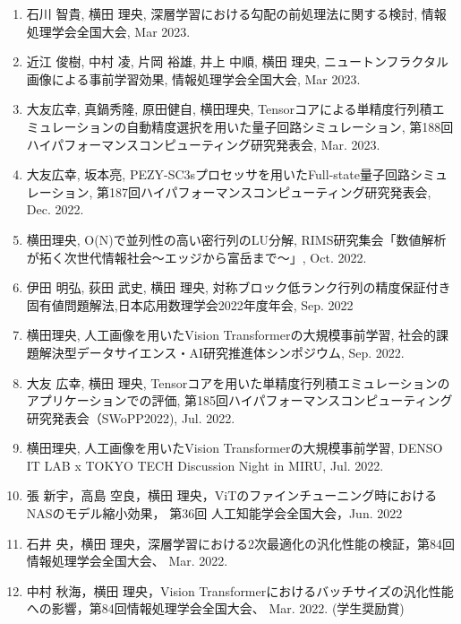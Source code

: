 \documentclass[margin,line]{cv}
\begin{document}
\begin{resume}
\begin{enumerate}
\item 石川 智貴, 横田 理央, 深層学習における勾配の前処理法に関する検討, 情報処理学会全国大会, Mar 2023.

\item 近江 俊樹, 中村 凌, 片岡 裕雄, 井上 中順, 横田 理央, ニュートンフラクタル画像による事前学習効果, 情報処理学会全国大会, Mar 2023.

\item 大友広幸, 真鍋秀隆, 原田健自, 横田理央, Tensorコアによる単精度行列積エミュレーションの自動精度選択を用いた量子回路シミュレーション, 第188回ハイパフォーマンスコンピューティング研究発表会, Mar. 2023.

\item 大友広幸, 坂本亮, PEZY-SC3sプロセッサを用いたFull-state量子回路シミュレーション, 第187回ハイパフォーマンスコンピューティング研究発表会, Dec. 2022.

\item 横田理央, O(N)で並列性の高い密行列のLU分解, RIMS研究集会「数値解析が拓く次世代情報社会～エッジから富岳まで～」, Oct. 2022.

\item 伊田 明弘, 荻田 武史, 横田 理央, 対称ブロック低ランク行列の精度保証付き固有値問題解法,日本応用数理学会2022年度年会, Sep. 2022

\item 横田理央, 人工画像を用いたVision Transformerの大規模事前学習, 社会的課題解決型データサイエンス・AI研究推進体シンポジウム, Sep. 2022.

\item 大友 広幸, 横田 理央, Tensorコアを用いた単精度行列積エミュレーションのアプリケーションでの評価, 第185回ハイパフォーマンスコンピューティング研究発表会（SWoPP2022), Jul. 2022.

\item 横田理央, 人工画像を用いたVision Transformerの大規模事前学習, DENSO IT LAB x TOKYO TECH Discussion Night in MIRU, Jul. 2022.

\item 張 新宇，高島 空良，横田 理央，ViTのファインチューニング時におけるNASのモデル縮小効果，
第36回 人工知能学会全国大会，Jun. 2022

\item 石井 央，横田 理央，深層学習における2次最適化の汎化性能の検証，第84回情報処理学会全国大会、 Mar. 2022.

\item 中村 秋海，横田 理央，Vision Transformerにおけるバッチサイズの汎化性能への影響，第84回情報処理学会全国大会、 Mar. 2022. (学生奨励賞)


\end{enumerate}
\end{resume}
\end{document}
